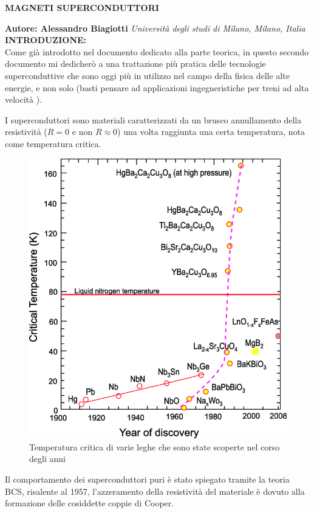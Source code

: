 \documentclass[a4paper,10pt]{article}
\begin{document}
\noindent
\begin{center}
	\textbf{{\Large MAGNETI SUPERCONDUTTORI}} \\
\end{center}

\noindent
\textbf{Autore: Alessandro Biagiotti} \textit{Università degli studi di Milano,
	Milano, Italia}
\\

\noindent
\textbf{INTRODUZIONE:}
\\
Come già introdotto nel documento dedicato alla parte teorica, in questo secondo documento mi
dedicherò a una trattazione più pratica delle tecnologie superconduttive che sono oggi più in
utilizzo nel campo della fisica delle alte energie, e non solo (basti pensare ad applicazioni
ingegneristiche per treni ad alta velocità \cite{maglev}).

I superconduttori sono materiali caratterizzati da un brusco annullamento della resistività ($R =
	0$ e non $R \approx 0$) una volta raggiunta una certa temperatura, nota come temperatura
critica.
\begin{figure}[h!]
	\centering

	\includegraphics[scale=0.35]{fig/The-evolution-of-critical-temperatures-since-the-discovery-of-superconductivity.png}
	\caption{
		Temperatura critica di varie leghe che sono state scoperte nel corso degli anni
		\cite{critical-temp}
	}
\end{figure}
Il comportamento dei superconduttori puri è stato spiegato tramite la teoria BCS, risalente al
1957, l'azzeramento della resistività del materiale è dovuto alla formazione delle cosiddette
coppie di Cooper.
\end{document}
